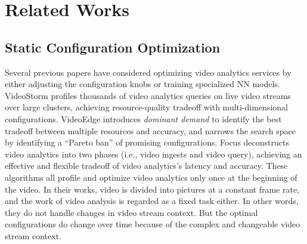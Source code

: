 \section{Related Works}
\label{Section: related_works}

\subsection{Static Configuration Optimization}
Several previous papers have considered optimizing video analytics services by either adjusting the configuration knobs or training specialized NN models. VideoStorm \cite{zhang2017videostorm} profiles thousands of video analytics queries on live video streams over large clusters, achieving resource-quality tradeoff with multi-dimensional configurations. VideoEdge \cite{hung2018videoedge} introduces \emph{dominant demand} to identify the best tradeoff between multiple resources and accuracy, and narrows the search space by identifying a ``Pareto ban'' of promising configurations. 
Focus \cite{hsieh2018focus} deconstructs video analytics into two phases (i.e., video ingests and video query), achieving an effective and flexible tradeoff of video analytics's latency and accuracy. These algorithms all profile and optimize video analytics only once at the beginning of the video. In their works, video is divided into pictures at a constant frame rate, and the work of video analysis is regarded as a fixed task either. In other words, they do not handle changes in video stream context. But the optimal configurations do change over time because of the complex and changeable video stream context.


